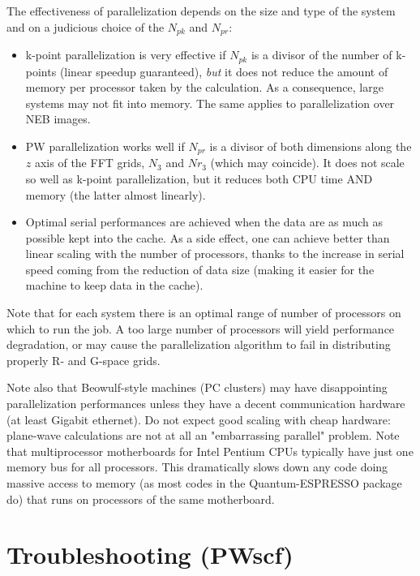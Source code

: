 \documentclass[12pt,a4paper]{article}
\begin{document}
The effectiveness of parallelization depends on the size and type of
the system and on a judicious choice of the $N_{pk}$ and $N_{pr}$:

\begin{itemize}
  \item
    k-point parallelization is very effective if $N_{pk}$ is a divisor
    of the number of k-points (linear speedup guaranteed), \emph{but}
    it does not reduce the amount of memory per processor taken by the
    calculation.
    As a consequence, large systems may not fit into memory.
    The same applies to parallelization over NEB images.
  \item
    PW parallelization works well if $N_{pr}$ is a divisor of both
    dimensions along the $z$ axis of the FFT grids, $N_3$ and $Nr_3$
    (which may coincide).
    It does not scale so well as k-point parallelization, but it
    reduces both CPU time AND memory (the latter almost linearly).
  \item
    Optimal serial performances are achieved when the data are as much
    as possible kept into the cache.
    As a side effect, one can achieve better than linear scaling with
    the number of processors, thanks to the increase in serial speed
    coming from the reduction of data size (making it easier for the
    machine to keep data in the cache).  
\end{itemize}

Note that for each system there is an optimal range of number of 
processors on which to run the job.
A too large number of processors will yield performance degradation,
or may cause the parallelization algorithm to fail in distributing
properly R- and G-space grids.

Note also that Beowulf-style machines (PC clusters) may have
disappointing parallelization performances unless they have a decent
communication hardware (at least Gigabit ethernet).
Do not expect good scaling with cheap hardware: plane-wave
calculations are not at all an "embarrassing parallel" problem. 
Note that multiprocessor motherboards for Intel Pentium CPUs typically
have just one memory bus for all processors.
This dramatically slows down any code doing massive access to memory
(as most codes in the Quantum-ESPRESSO package do) that runs on processors of
the same motherboard.

\clearpage

\section{Troubleshooting (PWscf)}
\end{document}

